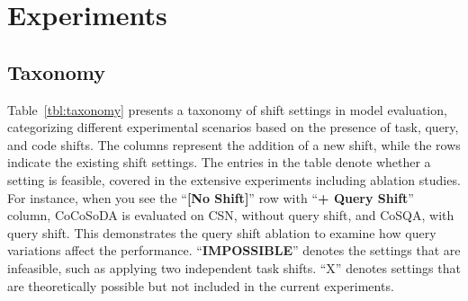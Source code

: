 \section{Experiments}
\subsection{Taxonomy}

Table~\ref{tbl:taxonomy} presents a taxonomy of shift settings in model evaluation,
categorizing different experimental scenarios based on the presence of task, query, and code shifts.
The columns represent the addition of a new shift, while the rows indicate the existing shift settings.
The entries in the table denote whether a setting is feasible, covered in the extensive experiments including ablation studies.
For instance, when you see the ``\textbf{[No Shift]}'' row with ``\textbf{+ Query Shift}'' column,
CoCoSoDA is evaluated on CSN, without query shift, and CoSQA, with query shift.
This demonstrates the query shift ablation to examine how query variations affect the performance.
``\textbf{IMPOSSIBLE}'' denotes the settings that are infeasible,
such as applying two independent task shifts.
``X'' denotes settings that are theoretically possible but not included in the current experiments.

\begin{table}[h]
    \caption{The taxonomy of experiments considering shift settings, where ``\textbf{[No Shift]}'' serves as the baseline.
    Each column represents the introduction of an additional shift, enabling ablation studies to analyze its impact.}
    \label{tbl:taxonomy}
\end{table}


